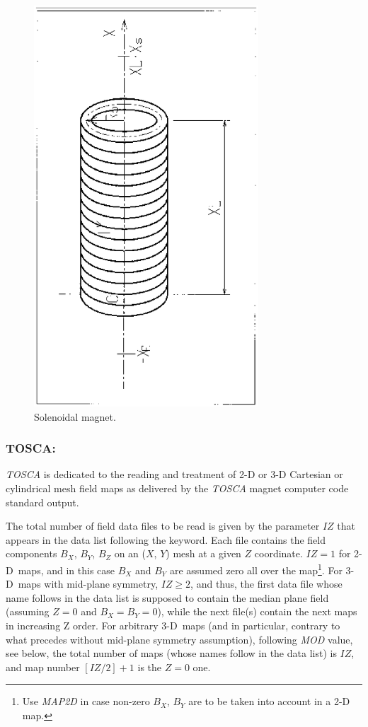 \begin{figure}[H]
\centerline{\includegraphics[height=15cm,angle=-90]{Fig30.ps}}
\caption{\label{fig30} Solenoidal magnet.}
\end{figure}
\vfill
\newpage

\subsubsection*{TOSCA: \TOSCATitl} \label{TOSCA} 
\medskip

 \textsl{TOSCA} is dedicated to the reading and treatment of 2-D or 
3-D Cartesian or cylindrical mesh field maps as  delivered by the
\textsl{TOSCA}  magnet computer code standard output.
\bigskip

\noindent The total number of field data files to be read is given by the 
parameter $IZ$ that appears in the data list following the keyword. 
Each file contains the field components $B_X$, $B_Y$, $B_Z$ on an 
($X$, $Y$) mesh at a given $Z$ coordinate. $IZ = 1$ for 2-D~maps, and 
in this case $B_X$ and $B_Y$ are assumed  zero all over the map\footnote{Use 
\textsl{MAP2D} in case non-zero $B_X$, $B_Y$ are to be taken into account in a 2-D map.}. 
For 3-D~maps with mid-plane symmetry, $IZ\ge 2$, and thus, the first 
data file whose name follows in the data list is supposed to contain the median 
plane field (assuming $ Z=0 $ and  $ B_X=B_Y=0$), while the next 
file(s) contain the next maps in increasing Z order. For arbitrary 3-D~maps 
(and in particular, contrary to what precedes without 
mid-plane symmetry assumption), following \textsl{MOD} value, see below, 
 the total number of maps (whose names follow in the data list) 
is $IZ$, and  map number $[IZ/2]+1$ is the $Z = 0$ one.
\bigskip

